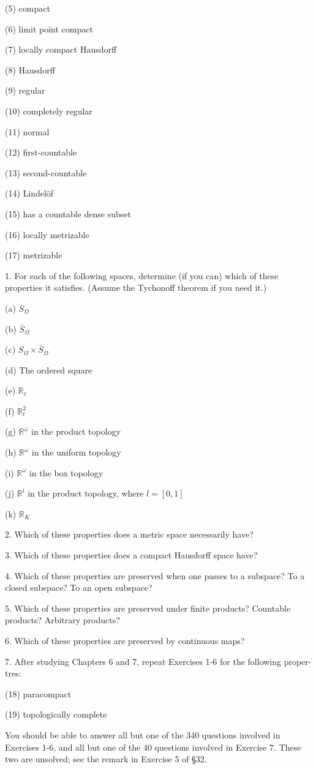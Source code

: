(5) compact

(6) limit point compact

(7) locally compact Hausdorff

(8) Hausdorff

(9) regular

(10) completely regular

(11) normal

(12) first-countable

(13) second-countable

(14) Lindelöf

(15) has a countable dense subset

(16) locally metrizable

(17) metrizable

1. For each of the following spaces, determine (if you can) which of these properties it satisfies. (Assume the Tychonoff theorem if you need it.)

(a) \({S}_{\Omega }\)

(b) \({\bar{S}}_{\Omega }\)

(c) \({S}_{\Omega } \times  {\bar{S}}_{\Omega }\)

(d) The ordered square

(e) \({\mathbb{R}}_{\ell }\)

(f) \({\mathbb{R}}_{t}^{2}\)

(g) \({\mathbb{R}}^{\omega }\) in the product topology

(h) \({\mathbb{R}}^{\omega }\) in the uniform topology

(i) \({\mathbb{R}}^{\omega }\) in the box topology

(j) \({\mathbb{R}}^{l}\) in the product topology, where \(l = \left\lbrack  {0,1}\right\rbrack\)

(k) \({\mathbb{R}}_{K}\)

2. Which of these properties does a metric space necessarily have?

3. Which of these properties does a compact Hausdorff space have?

4. Which of these properties are preserved when one passes to a subspace? To a closed subspace? To an open subspace?

5. Which of these properties are preserved under finite products? Countable products? Arbitrary products?

6. Which of these properties are preserved by continuous maps?

7. After studying Chapters 6 and 7, repeat Exercises 1-6 for the following proper-tres:

(18) paracompact

(19) topologically complete

You should be able to answer all but one of the 340 questions involved in Exercises 1-6, and all but one of the 40 questions involved in Exercise 7. These two are unsolved; see the remark in Exercise 5 of §32.